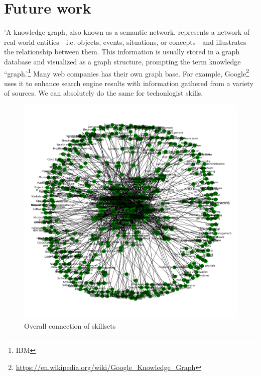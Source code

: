 \section{Future work}
'A knowledge graph, also known as a semantic network, represents a network of real-world entities—i.e. objects, events, situations, or concepts—and illustrates the relationship between them. This information is usually stored in a graph database and visualized as a graph structure, prompting the term knowledge “graph.'\footnote{IBM} Many web companies has their own graph base. For example, Google\footnote{\url{https://en.wikipedia.org/wiki/Google_Knowledge_Graph}} uses it to enhance search engine results with information gathered from a variety of sources. We can absolutely do the same for  techonlogist skills.
\begin{figure}[h]
	\begin{center}
		\includegraphics[width=\linewidth]{./photos/knowlegegraphsmall.png}
	\end{center}
	\caption{Overall connection of skillsets}
\end{figure}
